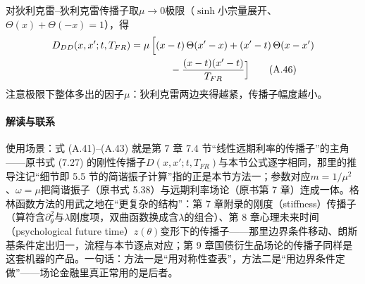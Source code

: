 对狄利克雷--狄利克雷传播子取$\mu\to0$极限（$\sinh$小宗量展开、$\Theta(x)+\Theta(-x)=1$），得
\begin{align*}
D_{DD}(x,x';t,T_{FR})
&=\mu\,\Bigl[(x-t)\,\Theta(x'-x)+(x'-t)\,\Theta(x-x')\\
&\qquad\qquad
-\frac{(x-t)(x'-t)}{T_{FR}}\Bigr]
\tag{A.46}
\end{align*}
注意极限下整体多出的因子$\mu$：狄利克雷两边夹得越紧，传播子幅度越小。

\paragraph{解读与联系}
使用场景：式 (A.41)--(A.43) 就是第 7 章 7.4 节“线性远期利率的传播子”的主角——原书式 (7.27) 的刚性传播子$D(x,x';t,T_{FR})$与本节公式逐字相同，那里的推导注记“细节即 5.5 节的简谐振子计算”指的正是本节方法一；参数对应$m=1/\mu^2$、$\omega=\mu$把简谐振子（原书式 5.38）与远期利率场论（原书第 7 章）连成一体。格林函数方法的用武之地在“更复杂的结构”：第 7 章附录的刚度（stiffness）传播子（算符含$\partial_\theta^2$与$\lambda$刚度项，双曲函数换成含$\lambda$的组合）、第 8 章心理未来时间（psychological future time）$z(\theta)$变形下的传播子——那里边界条件移动、朗斯基条件定出归一，流程与本节逐点对应；第 9 章国债衍生品场论的传播子同样是这套机器的产品。一句话：方法一是“用对称性查表”，方法二是“用边界条件定做”——场论金融里真正常用的是后者。

